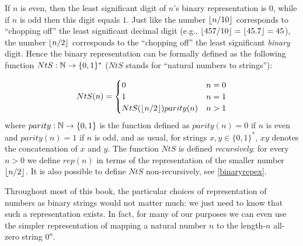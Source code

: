 If \(n\) is even, then the least significant digit of \(n\)'s binary
representation is \(0\), while if \(n\) is odd then this digit equals
\(1\). Just like the number \(\lfloor n/10 \rfloor\) corresponds to ``chopping
off'' the least significant decimal digit (e.g.,
\(\lfloor 457/10 \rfloor=\lfloor 45.7 \rfloor=45\)), the number \(\lfloor n/2 \rfloor\)
corresponds to the ``chopping off'' the least significant \emph{binary}
digit. Hence the binary representation can be formally defined as the
following function \(NtS:{\mathbb{N}} \rightarrow \{0,1\}^*\) (\(NtS\) stands for
``natural numbers to strings''):

\[NtS(n) = \begin{cases}
            0    &  n=0 \\
            1    &  n=1 \\
            NtS(\floor{n/2}) parity(n) & n>1
\end{cases} \label{ntseq}\] where \(parity:{\mathbb{N}} \rightarrow \{0,1\}\) is
the function defined as \(parity(n)=0\) if \(n\) is even and
\(parity(n)=1\) if \(n\) is odd, and as usual, for strings
\(x,y \in \{0,1\}^*\), \(xy\) denotes the concatenation of \(x\) and
\(y\). The function \(NtS\) is defined \emph{recursively}: for every
\(n>0\) we define \(rep(n)\) in terms of the representation of the
smaller number \(\lfloor n/2 \rfloor\). It is also possible to define \(NtS\)
non-recursively, see \cref{binaryrepex}.

Throughout most of this book, the particular choices of representation
of numbers as binary strings would not matter much: we just need to know
that such a representation exists. In fact, for many of our purposes we
can even use the simpler representation of mapping a natural number
\(n\) to the length-\(n\) all-zero string \(0^n\).

\hypertarget{pythonbinary}{}

